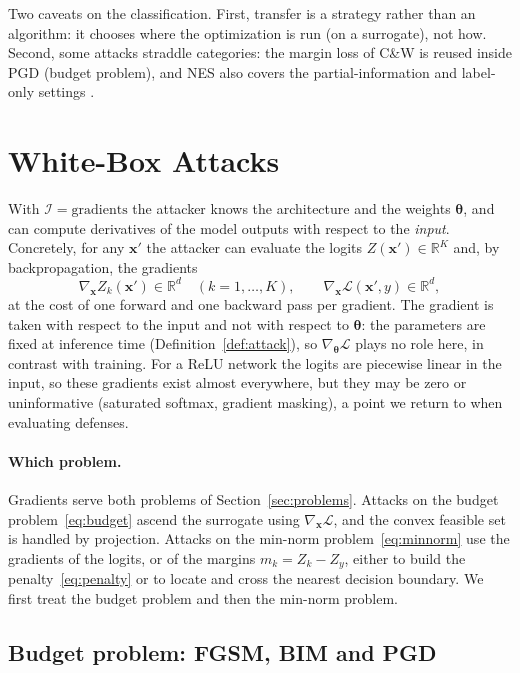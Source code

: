 \documentclass[10pt,a4paper]{extarticle}
\theoremstyle{definition}
\newcommand{\R}{\mathbb{R}}
\newcommand{\Loss}{\mathcal{L}}
\newcommand{\x}{\mathbf{x}}
\newcommand{\xadv}{\mathbf{x}'}
\newcommand{\btheta}{\boldsymbol{\theta}}
\begin{document}
Two caveats on the classification. First, transfer is a strategy rather than an algorithm: it chooses where the optimization is run (on a surrogate), not how. Second, some attacks straddle categories: the margin loss of C\&W is reused inside PGD (budget problem), and NES also covers the partial-information and label-only settings \citep{ilyas2018blackbox}.

\section{White-Box Attacks}\label{sec:whitebox}

With \(\mathcal{I}=\text{gradients}\) the attacker knows the architecture and the weights \(\btheta\), and can compute derivatives of the model outputs with respect to the \emph{input}. Concretely, for any \(\xadv\) the attacker can evaluate the logits \(Z(\xadv)\in\R^K\) and, by backpropagation, the gradients
\[
\nabla_{\x}Z_k(\xadv)\in\R^d\quad(k=1,\dots,K),
\qquad
\nabla_{\x}\Loss(\xadv,y)\in\R^d,
\]
at the cost of one forward and one backward pass per gradient. The gradient is taken with respect to the input and not with respect to \(\btheta\): the parameters are fixed at inference time (Definition~\ref{def:attack}), so \(\nabla_{\btheta}\Loss\) plays no role here, in contrast with training. For a ReLU network the logits are piecewise linear in the input, so these gradients exist almost everywhere, but they may be zero or uninformative (saturated softmax, gradient masking), a point we return to when evaluating defenses.

\paragraph{Which problem.} Gradients serve both problems of Section~\ref{sec:problems}. Attacks on the budget problem~\eqref{eq:budget} ascend the surrogate using \(\nabla_{\x}\Loss\), and the convex feasible set is handled by projection. Attacks on the min-norm problem~\eqref{eq:minnorm} use the gradients of the logits, or of the margins \(m_k=Z_k-Z_y\), either to build the penalty~\eqref{eq:penalty} or to locate and cross the nearest decision boundary. We first treat the budget problem and then the min-norm problem.

\subsection{Budget problem: FGSM, BIM and PGD}\label{sec:pgd}
\end{document}
